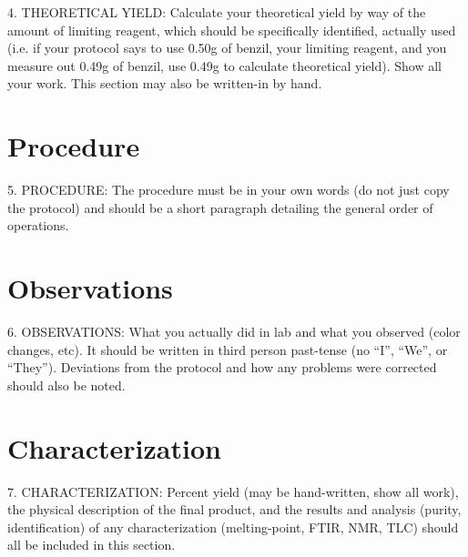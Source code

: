 \documentclass[letterpaper,amsmath,amssymb,prb,preprint,12pt]{revtex4-1}%
\begin{document}
4. THEORETICAL YIELD: Calculate your theoretical yield by way of the amount of
limiting reagent, which should be specifically identified, actually used (i.e. if your
protocol says to use 0.50g of benzil, your limiting reagent, and you measure out
0.49g of benzil, use 0.49g to calculate theoretical yield). Show all your work. This
section may also be written-in by hand.

\section{Procedure}


5. PROCEDURE: The procedure must be in your own words (do not just copy the
protocol) and should be a short paragraph detailing the general order of operations.

\section{Observations}


6. OBSERVATIONS: What you actually did in lab and what you observed (color
changes, etc). It should be written in third person past-tense (no “I”, “We”, or
“They”). Deviations from the protocol and how any problems were corrected should
also be noted.

\section{Characterization}


7. CHARACTERIZATION: Percent yield (may be hand-written, show all work), the
physical description of the final product, and the results and analysis (purity,
identification) of any characterization (melting-point, FTIR, NMR, TLC) should all
be included in this section.
\end{document}
